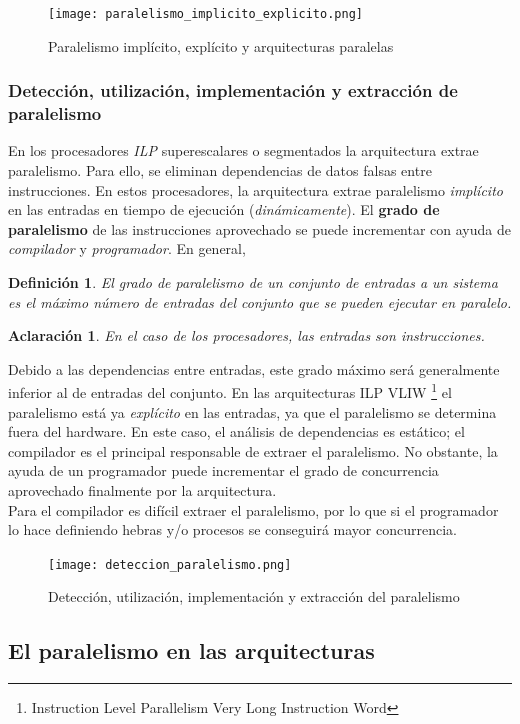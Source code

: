 \documentclass[12pt,spanish]{article}
\newtheorem*{definition}{Definición}
\newtheorem*{aclaration}{Aclaración}
\begin{document}
\begin{figure}[H]
\centering
\texttt{[image: paralelismo\_implicito\_explicito.png]}
\caption{Paralelismo implícito, explícito y arquitecturas paralelas}
\end{figure}

\subsubsection{Detección, utilización, implementación y extracción de paralelismo}

En los procesadores \textit{ILP} superescalares o segmentados la arquitectura extrae paralelismo. Para ello, se eliminan dependencias de datos falsas entre instrucciones. En estos procesadores, la arquitectura extrae paralelismo \emph{implícito} en las entradas en tiempo de ejecución (\textit{dinámicamente}). El \textbf{grado de paralelismo} de las instrucciones aprovechado se puede incrementar con ayuda de \emph{compilador} y \emph{programador}. En general,\begin{definition}
El grado de paralelismo de un conjunto de entradas a un sistema es el máximo número de entradas del conjunto que se pueden ejecutar en paralelo.
\end{definition}
\begin{aclaration}
En el caso de los procesadores, las entradas son instrucciones.
\end{aclaration}
Debido a las dependencias entre entradas, este grado máximo será generalmente inferior al de entradas del conjunto. En las arquitecturas ILP VLIW \footnote{Instruction Level Parallelism Very Long Instruction Word} el paralelismo está ya \emph{explícito} en las entradas, ya que el paralelismo se determina fuera del hardware. En este caso, el análisis de dependencias es estático; el compilador es el principal responsable de extraer el paralelismo. No obstante, la ayuda de un programador puede incrementar el grado de concurrencia aprovechado finalmente por la arquitectura.\\
Para el compilador es difícil extraer el paralelismo, por lo que si el programador lo hace definiendo hebras y/o procesos se conseguirá mayor concurrencia.
\begin{figure}[H]
\centering
\texttt{[image: deteccion\_paralelismo.png]}
\caption{Detección, utilización, implementación y extracción del paralelismo}
\end{figure}
\subsection{El paralelismo en las arquitecturas}
\end{document}
